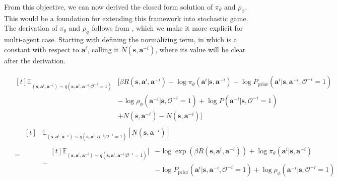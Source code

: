 From this objective, we can now derived the closed form solution of $\pi_{\theta}$ and $\rho_{\phi}$. This would be a foundation for extending this framework into stochastic game. The derivation of $\pi_{\theta}$ and $\rho_{\phi}$ follows from \cite{levine2018reinforcement}, which we make it more explicit for multi-agent case. 
\noindent
Starting with defining the normalizing term, in which is a constant with respect to $\boldsymbol{a}^i$, calling it $N(\boldsymbol{s}, \boldsymbol{a}^{-i})$, where its value will be clear after the derivation.

\begin{equation}
    \begin{aligned}
        &\begin{aligned}[t]
            \mathbb{E}_{(\boldsymbol{s}, \boldsymbol{a}^i, \boldsymbol{a}^{-i}) \sim q(\boldsymbol{s}, \boldsymbol{a}^i, \boldsymbol{a}^{-i} | \mathcal{O}^{-i} = 1)} &\Big[ \beta R(\boldsymbol{s}, \boldsymbol{a}^i, \boldsymbol{a}^{-i}) - \log \pi_{\theta}(\boldsymbol{a}^i | \boldsymbol{s}, \boldsymbol{a}^{-i}) + \log  P_{\text{prior}}(\boldsymbol{a}^i | \boldsymbol{s}, \boldsymbol{a}^{-i}, \mathcal{O}^{-i} = 1) \\
            & - \log \rho_{\phi}(\boldsymbol{a}^{-i} | \boldsymbol{s}, \mathcal{O}^{-i} = 1) + \log P(\boldsymbol{a}^{-i} |\boldsymbol{s}, \mathcal{O}^{-i} = 1) \\
            &+ N(\boldsymbol{s}, \boldsymbol{a}^{-i}) - N(\boldsymbol{s}, \boldsymbol{a}^{-i}) \Big]
        \end{aligned} \\
        &= \begin{aligned}[t]
            &\mathbb{E}_{(\boldsymbol{s}, \boldsymbol{a}^i, \boldsymbol{a}^{-i}) \sim q(\boldsymbol{s}, \boldsymbol{a}^i, \boldsymbol{a}^{-i} | \mathcal{O}^{-i} = 1)} [N(\boldsymbol{s}, \boldsymbol{a}^{-i})] \\
            &-\begin{aligned}[t]
                \mathbb{E}_{(\boldsymbol{s}, \boldsymbol{a}^i, \boldsymbol{a}^{-i}) \sim q(\boldsymbol{s}, \boldsymbol{a}^i, \boldsymbol{a}^{-i} | \mathcal{O}^{-i} = 1)} \Big[&-\log \exp\left( \beta R(\boldsymbol{s}, \boldsymbol{a}^i, \boldsymbol{a}^{-i})\right) + \log \pi_{\theta}(\boldsymbol{a}^i | \boldsymbol{s}, \boldsymbol{a}^{-i}) \\
                &-\log P_{\text{prior}}(\boldsymbol{a}^i | \boldsymbol{s}, \boldsymbol{a}^{-i}, \mathcal{O}^{-i} = 1) + \log \rho_{\phi}(\boldsymbol{a}^{-i} | \boldsymbol{s}, \mathcal{O}^{-i} = 1) \\

\end{aligned}
\end{aligned}
\end{aligned}
\end{equation}
